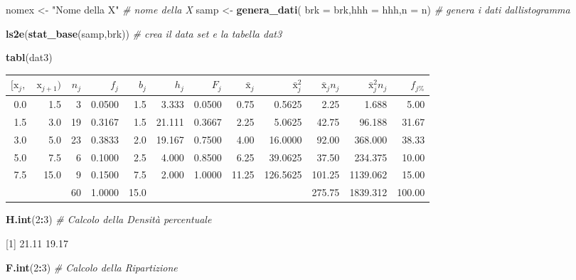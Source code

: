 \documentclass[
  11pt,
]{book}
\newenvironment{Shaded}{\begin{snugshade}}{\end{snugshade}}
\newcommand{\AttributeTok}[1]{\textcolor[rgb]{0.13,0.29,0.53}{#1}}
\newcommand{\CommentTok}[1]{\textcolor[rgb]{0.56,0.35,0.01}{\textit{#1}}}
\newcommand{\DecValTok}[1]{\textcolor[rgb]{0.00,0.00,0.81}{#1}}
\newcommand{\FunctionTok}[1]{\textcolor[rgb]{0.13,0.29,0.53}{\textbf{#1}}}
\newcommand{\NormalTok}[1]{#1}
\newcommand{\OtherTok}[1]{\textcolor[rgb]{0.56,0.35,0.01}{#1}}
\newcommand{\SpecialCharTok}[1]{\textcolor[rgb]{0.81,0.36,0.00}{\textbf{#1}}}
\newcommand{\StringTok}[1]{\textcolor[rgb]{0.31,0.60,0.02}{#1}}
\theoremstyle{mytheoremstyle}
\theoremstyle{mydefstyle}
\begin{document}
\begin{Shaded}
\begin{Highlighting}[]
\NormalTok{nomex }\OtherTok{\textless{}{-}} \StringTok{"Nome della X"}          \CommentTok{\# nome della X}
\NormalTok{samp }\OtherTok{\textless{}{-}} \FunctionTok{genera\_dati}\NormalTok{(}
  \AttributeTok{brk =}\NormalTok{ brk,}\AttributeTok{hhh =}\NormalTok{ hhh,}\AttributeTok{n =}\NormalTok{ n)     }\CommentTok{\# genera i dati dall\textquotesingle{}istogramma}

\FunctionTok{ls2e}\NormalTok{(}\FunctionTok{stat\_base}\NormalTok{(samp,brk))      }\CommentTok{\# crea il data set e la tabella dat3}

\FunctionTok{tabl}\NormalTok{(dat3)}
\end{Highlighting}
\end{Shaded}

\begin{table}[H]
\centering
\begin{tabular}{rrrrrrrrrrrr}
\toprule
$[\text{x}_j,$ & $\text{x}_{j+1})$ & $n_j$ & $f_j$ & $b_j$ & $h_j$ & $F_j$ & $\bar{\text{x}}_j$ & $\bar{\text{x}}_j^2$ & $\bar{\text{x}}_jn_j$ & $\bar{\text{x}}_j^2 n_j$ & $f_{j\%}$\\
\midrule
0.0 & 1.5 & 3 & 0.0500 & 1.5 & 3.333 & 0.0500 & 0.75 & 0.5625 & 2.25 & 1.688 & 5.00\\
1.5 & 3.0 & 19 & 0.3167 & 1.5 & 21.111 & 0.3667 & 2.25 & 5.0625 & 42.75 & 96.188 & 31.67\\
3.0 & 5.0 & 23 & 0.3833 & 2.0 & 19.167 & 0.7500 & 4.00 & 16.0000 & 92.00 & 368.000 & 38.33\\
5.0 & 7.5 & 6 & 0.1000 & 2.5 & 4.000 & 0.8500 & 6.25 & 39.0625 & 37.50 & 234.375 & 10.00\\
7.5 & 15.0 & 9 & 0.1500 & 7.5 & 2.000 & 1.0000 & 11.25 & 126.5625 & 101.25 & 1139.062 & 15.00\\
 &  & 60 & 1.0000 & 15.0 &  &  &  &  & 275.75 & 1839.312 & 100.00\\
\bottomrule
\end{tabular}
\end{table}

\begin{Shaded}
\begin{Highlighting}[]
\FunctionTok{H.int}\NormalTok{(}\DecValTok{2}\SpecialCharTok{:}\DecValTok{3}\NormalTok{)            }\CommentTok{\# Calcolo della Densità percentuale}
\end{Highlighting}
\end{Shaded}

{[}1{]} 21.11 19.17

\begin{Shaded}
\begin{Highlighting}[]
\FunctionTok{F.int}\NormalTok{(}\DecValTok{2}\SpecialCharTok{:}\DecValTok{3}\NormalTok{)            }\CommentTok{\# Calcolo della Ripartizione}
\end{Highlighting}
\end{Shaded}
\end{document}
